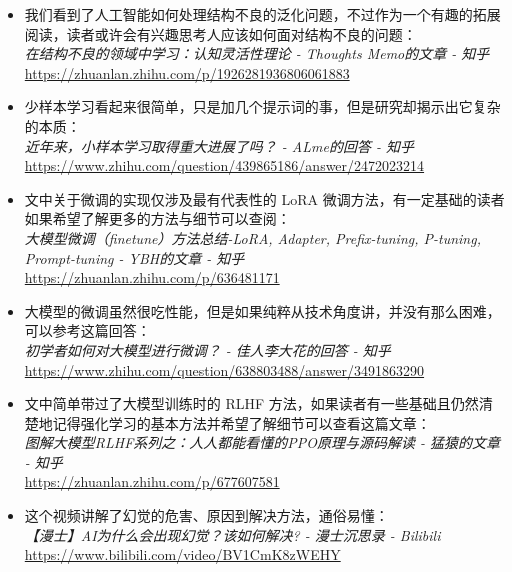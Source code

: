 \begin{tcolorbox}[myrecommendbox, title=推荐阅读, breakable=false]
    \begin{itemize}
        \item 我们看到了人工智能如何处理结构不良的泛化问题，不过作为一个有趣的拓展阅读，读者或许会有兴趣思考人应该如何面对结构不良的问题：\\
              \textit{在结构不良的领域中学习：认知灵活性理论 - Thoughts Memo的文章 - 知乎}\\
              \url{https://zhuanlan.zhihu.com/p/1926281936806061883}
        \item 少样本学习看起来很简单，只是加几个提示词的事，但是研究却揭示出它复杂的本质：\\
              \textit{近年来，小样本学习取得重大进展了吗？ - ALme的回答 - 知乎}\\
              \url{https://www.zhihu.com/question/439865186/answer/2472023214}
        \item 文中关于微调的实现仅涉及最有代表性的 LoRA 微调方法，有一定基础的读者如果希望了解更多的方法与细节可以查阅：\\
              \textit{大模型微调（finetune）方法总结-LoRA, Adapter, Prefix-tuning, P-tuning,}\\
              \textit{Prompt-tuning - YBH的文章 - 知乎}\\
              \url{https://zhuanlan.zhihu.com/p/636481171}
        \item 大模型的微调虽然很吃性能，但是如果纯粹从技术角度讲，并没有那么困难，可以参考这篇回答：\\
                \textit{初学者如何对大模型进行微调？ - 佳人李大花的回答 - 知乎}\\
                \url{https://www.zhihu.com/question/638803488/answer/3491863290}
        \item 文中简单带过了大模型训练时的 RLHF 方法，如果读者有一些基础且仍然清楚地记得强化学习的基本方法并希望了解细节可以查看这篇文章：\\
              \textit{图解大模型RLHF系列之：人人都能看懂的PPO原理与源码解读 - 猛猿的文章 - 知乎}\\
              \url{https://zhuanlan.zhihu.com/p/677607581}
        \item 这个视频讲解了幻觉的危害、原因到解决方法，通俗易懂：\\
              \textit{【漫士】AI为什么会出现幻觉？该如何解决? - 漫士沉思录 - Bilibili}\\
              \url{https://www.bilibili.com/video/BV1CmK8zWEHY}
    \end{itemize}
\end{tcolorbox}

\newpage